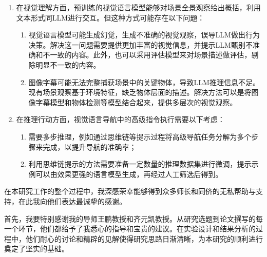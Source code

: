 \documentclass[bachelor]{thesis-uestc}
\begin{document}

\begin{enumerate}
    \item 在视觉理解方面，预训练的视觉语言模型能够对场景全景观察给出概括，利用文本形式同LLM进行交互。但这种方式可能存在以下问题：
    \begin{enumerate}
        \item 视觉语言模型可能生成幻觉，生成不准确的视觉观察，误导LLM做出行为决策。解决这一问题需要提供更加丰富的视觉信息，并提示LLM甄别不准确和不一致的内容。此外，也可以采用评估模型来对场景描述做评估，剔除明显不一致的内容。
        \item 图像字幕可能无法完整捕获场景中的关键物体，导致LLM推理信息不足。现有场景观察基于环境特征，缺乏物体层面的描述。解决方法可以是将图像字幕模型和物体检测等模型结合起来，提供多层次的视觉观察。
    \end{enumerate}
    
    \item 在推理行动方面，视觉语言导航中的高级指令执行需要以下考虑：
    \begin{enumerate}
        \item 需要多步推理，例如通过思维链等提示过程将高级导航任务分解为多个步骤来完成，以提升导航的准确率；
        \item 利用思维链提示的方法需要准备一定数量的推理数据集进行微调，提示示例可以由效果更强的语言模型生成，再经过人工筛选后得到。
    \end{enumerate}
\end{enumerate}

\thesisacknowledgement

在本研究工作的整个过程中，我深感荣幸能够得到众多师长和同侪的无私帮助与支持，在此我向他们表达最诚挚的感谢。 

首先，我要特别感谢我的导师王鹏教授和齐元凯教授。从研究选题到论文撰写的每一个环节，他们都给予了我悉心的指导和宝贵的建议。在实验设计和结果分析的过程中，他们耐心的讨论和精辟的见解使得研究思路日渐清晰，为本研究的顺利进行奠定了坚实的基础。 
\end{document}
